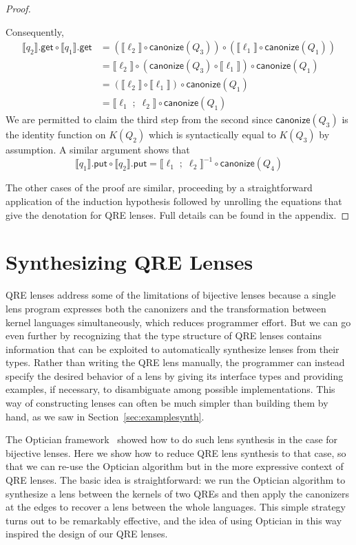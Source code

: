 \documentclass[acmsmall,review,anonymous]{acmart}
\newcommand{\codefont}[1]{\ensuremath{\mathsf{#1}}}
\newcommand{\kw}[1]{\codefont{#1}}
\newcommand{\canonize}{\ensuremath{\kw{canonize}}}
\newcommand{\get}{\ensuremath{\kw{get}}}
\newcommand{\lput}{\ensuremath{\kw{put}}}
\begin{document}
\begin{proof}
\begin{center}
\end{center}
%
Consequently,
\begin{align*}
\llbracket q_2 \rrbracket.\get \circ \llbracket q_1 \rrbracket.\get &=
(\llbracket \ell_2 \rrbracket \circ \canonize(Q_3)) \circ (\llbracket \ell_1
\rrbracket \circ \canonize(Q_1))\\
&= \llbracket \ell_2 \rrbracket \circ (\canonize(Q_3) \circ \llbracket \ell_1
\rrbracket) \circ \canonize(Q_1)\\
&= (\llbracket \ell_2 \rrbracket \circ \llbracket \ell_1 \rrbracket) \circ
\canonize(Q_1)\\
&= \llbracket \ell_1 \; ; \; \ell_2 \rrbracket \circ \canonize(Q_1)
\end{align*}
We are permitted to claim the third step from the second since
$\canonize(Q_3)$ is the identity function on $K(Q_2)$ which is
syntactically equal to $K(Q_3)$ by assumption. A similar argument shows that
$$\llbracket q_1 \rrbracket.\lput \circ \llbracket q_2 \rrbracket.\lput =
\llbracket \ell_1 \; ; \; \ell_2 \rrbracket^{-1} \circ
\canonize(Q_4)$$

The other cases of the proof are similar, proceeding by a
straightforward application of the induction hypothesis followed by unrolling
the equations that give the denotation for QRE lenses.  Full details can be
found in the appendix.
\end{proof}

\section{Synthesizing QRE Lenses}
\label{synth}

QRE lenses address some of the limitations of bijective lenses because a single
lens program expresses both the canonizers and the transformation between kernel
languages simultaneously, which reduces programmer effort.  But we can go even
further by recognizing that the type structure of QRE lenses contains
information that can be exploited to automatically synthesize lenses from their
types.  Rather than writing the QRE lens manually, the programmer can instead
specify the desired behavior of a lens by giving its interface types and providing
examples, if necessary, to disambiguate among possible implementations.  This
way of constructing lenses can often be much simpler than building them by
hand, as we saw in Section~\ref{sec:examplesynth}.

The Optician framework~\cite{optician} showed how to do such lens synthesis in
the case for bijective lenses. Here we show how to reduce QRE lens synthesis to
that case, so that we can re-use the Optician algorithm but in the more
expressive context of QRE lenses.  The basic idea is straightforward: we run the
Optician algorithm to synthesize a lens between the kernels of two QREs and then
apply the canonizers at the edges to recover a lens between the whole
languages.  This simple strategy turns out to be remarkably effective, and the
idea of using Optician in this way inspired the design of our QRE lenses.  
\end{document}
